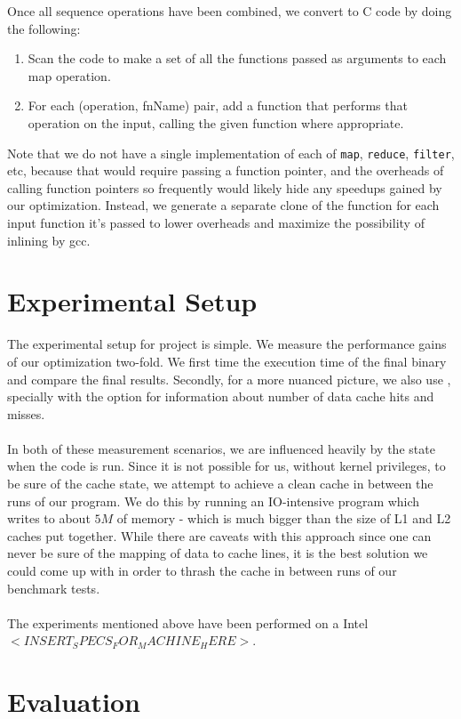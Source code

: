 \documentclass[a4paper,twocolumn]{article}
\newcommand{\sml}[1]{\texttt{#1}}
\begin{document}
\noindent
Once all sequence operations have been combined, we convert to C code by doing the following:
\begin{enumerate}
\item Scan the code to make a set of all the functions passed as arguments to each map operation.
\item For each (operation, fnName) pair, add a function that performs that operation on the input, calling the given function where appropriate.
\end{enumerate}
\noindent
Note that we do not have a single implementation of each of \sml{map}, \sml{reduce}, \sml{filter}, etc, because that would require passing a function pointer, and the overheads of calling function pointers so frequently would likely hide any speedups gained by our optimization. Instead, we generate a separate clone of the function for each input function it's passed to lower overheads and maximize the possibility of inlining by gcc.




\section{Experimental Setup}
The experimental setup for project is simple. We measure the performance gains
of our optimization two-fold. We first time the execution time of the final
binary and compare the final results. Secondly, for a more nuanced picture, we
also use , specially with the  option for
information about number of data cache hits and misses.
\\
\\In both of these measurement scenarios, we are influenced heavily by the
state when the code is run. Since it is not possible for us, without kernel
privileges, to be sure of the cache state, we attempt to achieve a clean cache
in between the runs of our program. We do this by running an IO-intensive
program which writes to about $5M$ of memory - which is much bigger than the
size of L1 and L2 caches put together. While there are caveats with this approach
since one can never be sure of the mapping of data to cache lines, it is the
best solution we could come up with in order to thrash the cache in between
runs of our benchmark tests.
\\
\\ The experiments mentioned above have been performed on a Intel
$<INSERT_SPECS_FOR_MACHINE_HERE>$.
\section{Evaluation}
\end{document}

